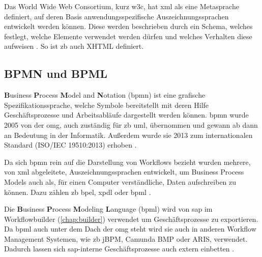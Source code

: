 Das World Wide Web Consortium, kurz \gls{w3c}, hat \gls{xml} als eine Metasprache definiert, auf deren Basis anwendungsspezifische Auszeichnungssprachen entwickelt werden können. Diese werden beschrieben durch ein Schema, welches festlegt, welche Elemente verwendet werden dürfen und welches Verhalten diese aufweisen \cite{XML}. So ist \gls{zb} auch XHTML definiert.

\subsection{BPMN und BPML}
\label{sec:export-bpmn-bpml}

\textbf{B}usiness \textbf{P}rocess \textbf{M}odel and \textbf{N}otation (\gls{bpmn}) ist eine grafische Spezifikationssprache, welche Symbole bereitstellt mit deren Hilfe Geschäftsprozesse und Arbeitsabläufe dargestellt werden können.\cite{BPMN} \gls{bpmn} wurde 2005 von der \gls{omg}, auch zuständig für \gls{zb} \gls{uml}, übernommen und gewann ab dann an Bedeutung in der Informatik. Außerdem wurde sie 2013 zum internationalen Standard (ISO/IEC 19510:2013) erhoben \cite{OMG}.

Da sich \gls{bpmn} rein auf die Darstellung von Workflows bezieht wurden mehrere, von \gls{xml} abgeleitete, Auszeichnungssprachen entwickelt, um Business Process Models auch als, für einen Computer verständliche, Daten aufschreiben zu können. Dazu zählen \gls{zb} \gls{bpel}, \gls{xpdl} oder \gls{bpml} \cite{BPMN}.

Die \textbf{B}usiness \textbf{P}rocess \textbf{M}odeling \textbf{L}anguage (\gls{bpml}) wird von \gls{sap} im Workflowbuilder (\ref{chap:builder}) verwendet um Geschäftsprozesse zu exportieren. Da \gls{bpml} auch unter dem Dach der \gls{omg} steht wird sie auch in anderen Workflow Management Systemen, wie \gls{zb} jBPM, Camunda BMP oder ARIS, verwendet. Dadurch lassen sich \gls{sap}-interne Geschäftsprozesse auch extern einbetten \cite{BPML}.